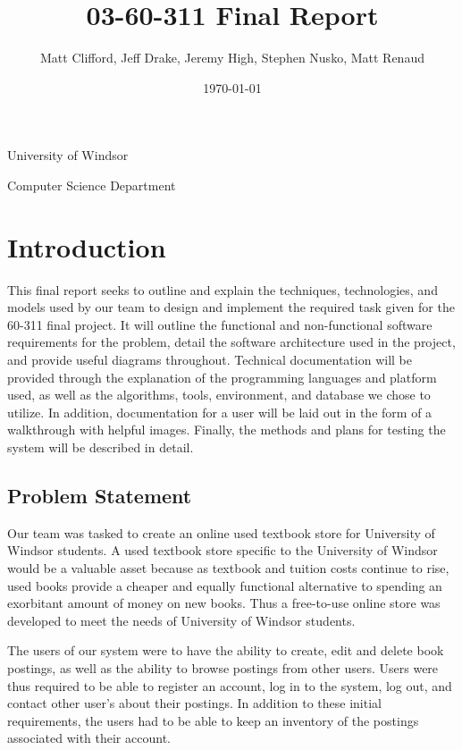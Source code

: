 \documentclass[11pt]{article}
\title{03-60-311 Final Report}
\author{Matt Clifford, Jeff Drake, Jeremy High, Stephen Nusko, Matt Renaud}
\date{\today}
\begin{document}
\maketitle

\vspace{1.5in}

\begin{center}
  University of Windsor

  Computer Science Department
\end{center}

\newpage
\setcounter{tocdepth}{3}
\tableofcontents
\vspace*{1cm}


\newpage
\section{Introduction}
\label{sec:introduction}

This final report seeks to outline and explain the techniques,
technologies, and models used by our team to design and implement the
required task given for the 60-311 final project. It will outline the
functional and non-functional software requirements for the problem,
detail the software architecture used in the project, and provide
useful diagrams throughout. Technical documentation will be provided
through the explanation of the programming languages and platform
used, as well as the algorithms, tools, environment, and database we
chose to utilize. In addition, documentation for a user will be laid
out in the form of a walkthrough with helpful images. Finally, the
methods and plans for testing the system will be described in detail.

\subsection{Problem Statement}
\label{sec:prodlem-statement}

Our team was tasked to create an online used textbook store for
University of Windsor students. A used textbook store specific to the
University of Windsor would be a valuable asset because as textbook
and tuition costs continue to rise, used books provide a cheaper and
equally functional alternative to spending an exorbitant amount of
money on new books. Thus a free-to-use online store was developed to
meet the needs of University of Windsor students.

The users of our system were to have the ability to create, edit and
delete book postings, as well as the ability to browse postings from
other users. Users were thus required to be able to register an
account, log in to the system, log out, and contact other user’s about
their postings. In addition to these initial requirements, the users
had to be able to keep an inventory of the postings associated with
their account.
\end{document}

